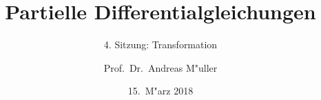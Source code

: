 %
%
%
\usepackage[utf8]{inputenc}
\usepackage[T1]{fontenc}
\usepackage{epic}
\usepackage{color}
\usepackage{array}
\usepackage{ifthen}
\usepackage{tikz}
\usepackage{german}
\usetikzlibrary{shapes.geometric,decorations.pathmorphing}
\beamertemplatenavigationsymbolsempty

\title[]{Partielle Differentialgleichungen}
\subtitle{4. Sitzung: Transformation}
\date[15.~M"arz 2018]{15.~M"arz 2018}
\author{Prof.~Dr.~Andreas M"uller}


